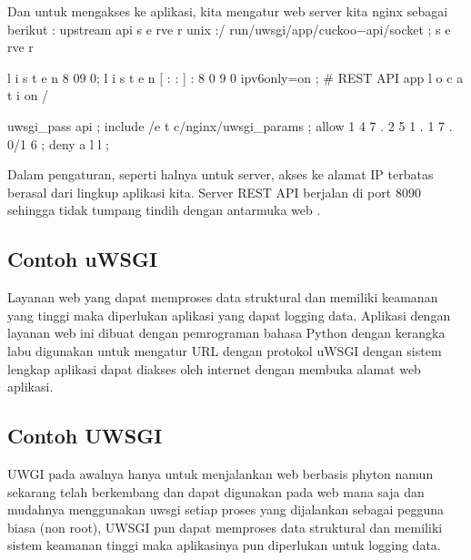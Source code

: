 Dan untuk mengakses ke aplikasi, kita mengatur web server kita nginx sebagai berikut :
upstream api {
s e rve r unix :/ run/uwsgi/app/cuckoo−api/socket ;
}
s e rve r {
l i s t e n 8 09 0;
l i s t e n [ : : ] : 8 0 9 0 ipv6only=on ;
# REST API app
l o c a t i on / {
uwsgi_pass api ;
include /e t c/nginx/uwsgi_params ;
allow 1 4 7 . 2 5 1 . 1 7 . 0/1 6 ;
deny a l l ;

Dalam pengaturan, seperti halnya untuk server, akses ke alamat IP terbatas berasal dari lingkup aplikasi kita. Server REST API berjalan di port 8090 sehingga tidak tumpang tindih dengan antarmuka web \cite{beran2017analyza}.

\subsection{Contoh uWSGI}
Layanan web yang dapat memproses data struktural dan memiliki keamanan yang tinggi maka diperlukan aplikasi yang dapat logging data. Aplikasi dengan layanan web ini dibuat dengan pemrograman bahasa Python dengan kerangka labu digunakan untuk mengatur URL dengan protokol uWSGI dengan sistem lengkap aplikasi dapat diakses oleh internet dengan membuka alamat web aplikasi\cite{rudiana2015perancangan}. 

\subsection{Contoh UWSGI}
UWGI pada awalnya hanya untuk menjalankan web berbasis phyton namun sekarang telah berkembang dan dapat digunakan pada web mana saja dan mudahnya menggunakan uwsgi setiap proses yang dijalankan sebagai pegguna biasa (non root), UWSGI pun dapat memproses data struktural dan memiliki sistem keamanan tinggi maka aplikasinya pun diperlukan untuk logging data\cite{rajagukguksearch}. 

}}
